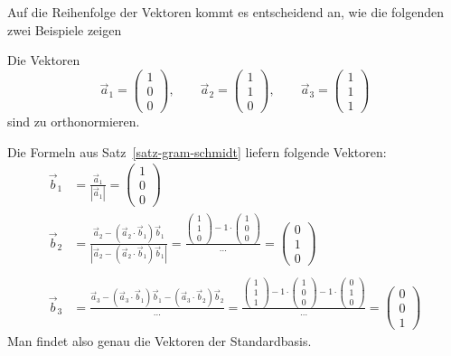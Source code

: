 Auf die Reihenfolge der Vektoren kommt es entscheidend an, wie die 
folgenden zwei Beispiele zeigen
\begin{beispiel}
Die Vektoren 
\[
\vec a_1=\begin{pmatrix}1\\0\\0\end{pmatrix},\qquad
\vec a_2=\begin{pmatrix}1\\1\\0\end{pmatrix},\qquad
\vec a_3=\begin{pmatrix}1\\1\\1\end{pmatrix} 
\]
sind zu orthonormieren.

Die Formeln aus Satz~\ref{satz-gram-schmidt} liefern folgende Vektoren:
\begin{align*}
\vec b_1&=\frac{\vec a_1}{|\vec a_1|}=\begin{pmatrix}1\\0\\0\end{pmatrix}\\
\vec b_2&=
\frac{
\vec a_2-(\vec a_2\cdot \vec b_1)\vec b_1
}{
|\vec a_2-(\vec a_2\cdot \vec b_1)\vec b_1|
}
=
\frac{
\begin{pmatrix}1\\1\\0\end{pmatrix}-1\cdot\begin{pmatrix}1\\0\\0\end{pmatrix}
}{\dots}=\begin{pmatrix}0\\1\\0\end{pmatrix}\\
\\
\vec b_3&=
\frac{\vec a_3 -(\vec a_3\cdot \vec b_1)\vec b_1-(\vec a_3\cdot\vec b_2)\vec b_2}{\dots}
=\frac{\begin{pmatrix}1\\1\\1\end{pmatrix}-1\cdot \begin{pmatrix}1\\0\\0\end{pmatrix}-1\cdot\begin{pmatrix}0\\1\\0\end{pmatrix}
}{\dots}=\begin{pmatrix}0\\0\\1\end{pmatrix}
\end{align*}
Man findet also genau die Vektoren der Standardbasis.
\end{beispiel}

